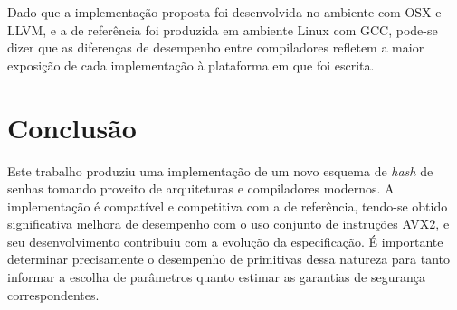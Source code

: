 \documentclass{article}
\begin{document}
Dado que a implementação proposta foi desenvolvida no ambiente com OSX e
LLVM, e a de referência foi produzida em ambiente Linux com GCC,
pode-se dizer que as diferenças de desempenho entre compiladores
refletem a maior exposição de cada implementação à plataforma em que foi
escrita.

\section{Conclusão}

Este trabalho produziu uma implementação de um novo esquema de
\emph{hash} de senhas tomando proveito de arquiteturas e compiladores
modernos. A implementação é compatível e competitiva com a de
referência, tendo-se obtido significativa melhora de desempenho com o
uso conjunto de instruções AVX2, e seu desenvolvimento contribuiu com a
evolução da especificação.
É importante determinar precisamente o desempenho de primitivas dessa natureza para tanto informar a escolha de parâmetros
quanto estimar as garantias de segurança correspondentes.



\end{document}
